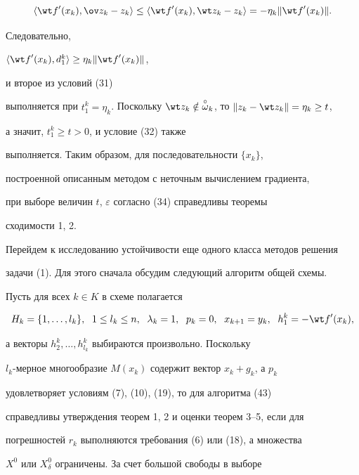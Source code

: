$$


\langle {{\wt f}'(x_k),\ov z_k-z_k}\rangle\le


\langle {{\wt f}'(x_k),\wt z_k-z_k}\rangle =-\eta_k\|{{\wt f}'(x_k)}\|.


$$


Следовательно,


$\langle {{\wt f}'(x_k),d_1^k}\rangle\ge\eta_k\|{{\wt f}'(x_k)}\|$,


и второе из условий (31)


выполняется при $t_1^k=\eta_k$. Поскольку $\wt z_k\notin


\overset{\circ}{\omega}_k$, то $\|{z_k-\wt z_k}\|=\eta_k\ge t$,


а значит, $t_1^k\ge t>0$, и условие (32) также


выполняется. Таким образом, для последовательности $\{{x_k}\}$,


построенной описанным методом с неточным вычислением градиента,


при выборе величин $t$, $\varepsilon$ согласно (34) справедливы теоремы


сходимости 1, 2.





Перейдем к исследованию устойчивости еще одного класса методов решения


задачи (1). Для этого сначала обсудим следующий алгоритм общей схемы.


Пусть для всех $k\in K$ в схеме полагается


\begin{equation}


H_k=\{{1,\dotsc,l_k}\},\ \; 1\le l_k\le n,\ \; \lambda_k=1,\ \; p_k=0,


\ \; x_{k+1}=y_k,\ \; h_1^k=-{\wt f}'(x_k),


\end{equation}


а векторы $h_2^k,\dotsc,h_{l_k}^k$ выбираются произвольно. Поскольку


$l_k$-мерное многообразие $M(x_k)$ содержит вектор $x_k+g_k$, а $p_k$


удовлетворяет условиям (7), (10), (19), то для алгоритма (43)


справедливы утверждения теорем 1, 2 и оценки теорем 3--5, если для


погрешностей $r_k$ выполняются требования (6) или (18), а множества


$X^{0}$ или $X_\delta^{0}$ ограничены. За счет большой свободы в выборе


